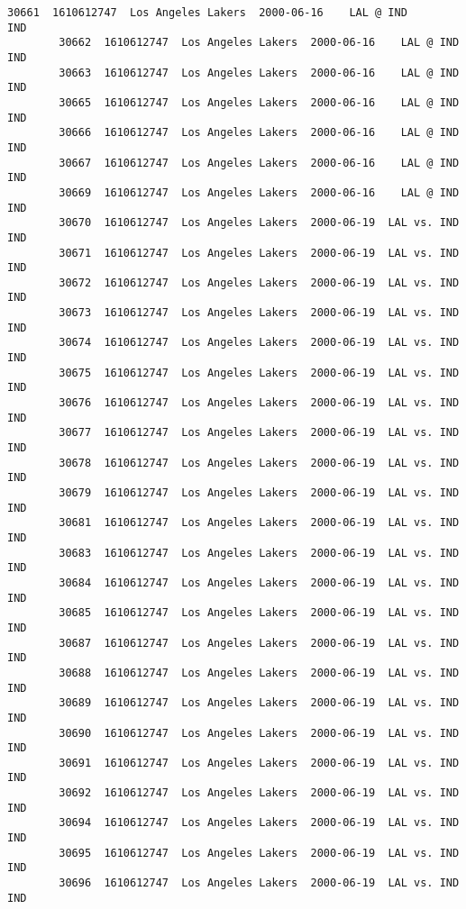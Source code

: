 \documentclass[11pt]{article}
\begin{document}
\begin{Verbatim}[commandchars=\\\{\}]
        30661  1610612747  Los Angeles Lakers  2000-06-16    LAL @ IND      IND   
        30662  1610612747  Los Angeles Lakers  2000-06-16    LAL @ IND      IND   
        30663  1610612747  Los Angeles Lakers  2000-06-16    LAL @ IND      IND   
        30665  1610612747  Los Angeles Lakers  2000-06-16    LAL @ IND      IND   
        30666  1610612747  Los Angeles Lakers  2000-06-16    LAL @ IND      IND   
        30667  1610612747  Los Angeles Lakers  2000-06-16    LAL @ IND      IND   
        30669  1610612747  Los Angeles Lakers  2000-06-16    LAL @ IND      IND   
        30670  1610612747  Los Angeles Lakers  2000-06-19  LAL vs. IND      IND   
        30671  1610612747  Los Angeles Lakers  2000-06-19  LAL vs. IND      IND   
        30672  1610612747  Los Angeles Lakers  2000-06-19  LAL vs. IND      IND   
        30673  1610612747  Los Angeles Lakers  2000-06-19  LAL vs. IND      IND   
        30674  1610612747  Los Angeles Lakers  2000-06-19  LAL vs. IND      IND   
        30675  1610612747  Los Angeles Lakers  2000-06-19  LAL vs. IND      IND   
        30676  1610612747  Los Angeles Lakers  2000-06-19  LAL vs. IND      IND   
        30677  1610612747  Los Angeles Lakers  2000-06-19  LAL vs. IND      IND   
        30678  1610612747  Los Angeles Lakers  2000-06-19  LAL vs. IND      IND   
        30679  1610612747  Los Angeles Lakers  2000-06-19  LAL vs. IND      IND   
        30681  1610612747  Los Angeles Lakers  2000-06-19  LAL vs. IND      IND   
        30683  1610612747  Los Angeles Lakers  2000-06-19  LAL vs. IND      IND   
        30684  1610612747  Los Angeles Lakers  2000-06-19  LAL vs. IND      IND   
        30685  1610612747  Los Angeles Lakers  2000-06-19  LAL vs. IND      IND   
        30687  1610612747  Los Angeles Lakers  2000-06-19  LAL vs. IND      IND   
        30688  1610612747  Los Angeles Lakers  2000-06-19  LAL vs. IND      IND   
        30689  1610612747  Los Angeles Lakers  2000-06-19  LAL vs. IND      IND   
        30690  1610612747  Los Angeles Lakers  2000-06-19  LAL vs. IND      IND   
        30691  1610612747  Los Angeles Lakers  2000-06-19  LAL vs. IND      IND   
        30692  1610612747  Los Angeles Lakers  2000-06-19  LAL vs. IND      IND   
        30694  1610612747  Los Angeles Lakers  2000-06-19  LAL vs. IND      IND   
        30695  1610612747  Los Angeles Lakers  2000-06-19  LAL vs. IND      IND   
        30696  1610612747  Los Angeles Lakers  2000-06-19  LAL vs. IND      IND   
        

\end{Verbatim}
\end{document}
